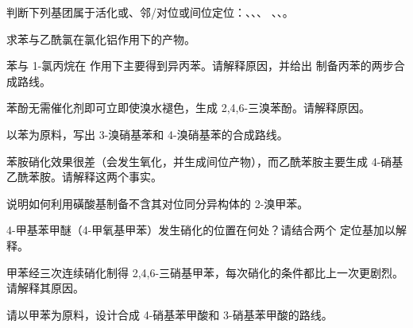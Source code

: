 \begin{exercise}[$\star$]\label{exo:b2:aromatic-substitution:3}
判断下列基团属于活化或、邻/对位或间位定位：、、、
、、。
\end{exercise}

\begin{exercise}[$\star$]\label{exo:b2:aromatic-substitution:4}
求苯与乙酰氯在氯化铝作用下的产物。
\end{exercise}

\begin{exercise}[$\star\star$]\label{exo:b2:aromatic-substitution:5}
苯与 1-氯丙烷在  作用下主要得到异丙苯。请解释原因，并给出
制备丙苯的两步合成路线。
\end{exercise}

\begin{exercise}[$\star\star$]\label{exo:b2:aromatic-substitution:6}
苯酚无需催化剂即可立即使溴水褪色，生成
2,4,6-三溴苯酚。请解释原因。
\end{exercise}

\begin{exercise}[$\star\star$]\label{exo:b2:aromatic-substitution:7}
以苯为原料，写出 3-溴硝基苯和 4-溴硝基苯的合成路线。
\end{exercise}

\begin{exercise}[$\star\star$]\label{exo:b2:aromatic-substitution:8}
苯胺硝化效果很差（会发生氧化，并生成间位产物），而乙酰苯胺主要生成
4-硝基乙酰苯胺。请解释这两个事实。
\end{exercise}

\begin{exercise}[$\star\star$]\label{exo:b2:aromatic-substitution:9}
说明如何利用磺酸基制备不含其对位同分异构体的 2-溴甲苯。
\end{exercise}

\begin{exercise}[$\star\star\star$]\label{exo:b2:aromatic-substitution:10}
4-甲基苯甲醚（4-甲氧基甲苯）发生硝化的位置在何处？请结合两个
定位基加以解释。
\end{exercise}

\begin{exercise}[$\star\star\star$]\label{exo:b2:aromatic-substitution:11}
甲苯经三次连续硝化制得 2,4,6-三硝基甲苯，每次硝化的条件都比上一次更剧烈。
请解释其原因。
\end{exercise}

\begin{exercise}[$\star\star\star$]\label{exo:b2:aromatic-substitution:12}
请以甲苯为原料，设计合成 4-硝基苯甲酸和 3-硝基苯甲酸的路线。
\end{exercise}

